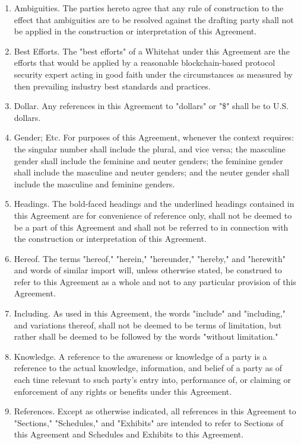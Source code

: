 \documentclass{article}
\begin{document}
\begin{enumerate}[label=\Alph*.]
    \item Ambiguities. The parties hereto agree that any rule of construction to the effect that ambiguities are to be resolved against the drafting party shall not be applied in the construction or interpretation of this Agreement.

    \item Best Efforts. The "best efforts" of a Whitehat under this Agreement are the efforts that would be applied by a reasonable blockchain-based protocol security expert acting in good faith under the circumstances as measured by then prevailing industry best standards and practices.

    \item Dollar. Any references in this Agreement to "dollars" or "\$" shall be to U.S. dollars.

    \item Gender; Etc. For purposes of this Agreement, whenever the context requires: the singular number shall include the plural, and vice versa; the masculine gender shall include the feminine and neuter genders; the feminine gender shall include the masculine and neuter genders; and the neuter gender shall include the masculine and feminine genders.

    \item Headings. The bold-faced headings and the underlined headings contained in this Agreement are for convenience of reference only, shall not be deemed to be a part of this Agreement and shall not be referred to in connection with the construction or interpretation of this Agreement.

    \item Hereof. The terms "hereof," "herein," "hereunder," "hereby," and "herewith" and words of similar import will, unless otherwise stated, be construed to refer to this Agreement as a whole and not to any particular provision of this Agreement.

    \item Including. As used in this Agreement, the words "include" and "including," and variations thereof, shall not be deemed to be terms of limitation, but rather shall be deemed to be followed by the words "without limitation."

    \item Knowledge. A reference to the awareness or knowledge of a party is a reference to the actual knowledge, information, and belief of a party as of each time relevant to such party's entry into, performance of, or claiming or enforcement of any rights or benefits under this Agreement.

    \item References. Except as otherwise indicated, all references in this Agreement to "Sections," "Schedules," and "Exhibits" are intended to refer to Sections of this Agreement and Schedules and Exhibits to this Agreement.
\end{enumerate}
\end{document}

